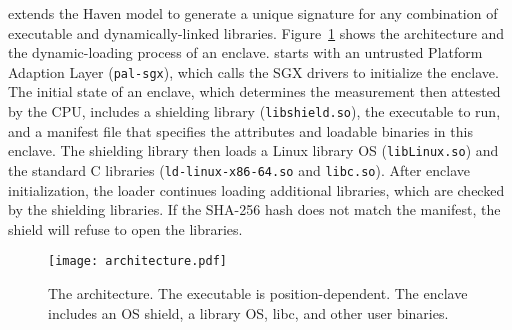 \graphenesgx{} extends the Haven model to generate a unique signature for
any combination of executable and dynamically-linked libraries.
Figure~\ref{fig:arch} shows the architecture and the dynamic-loading process
of an enclave. %
\graphenesgx{} starts with an untrusted Platform Adaption Layer ({\tt pal-sgx}), which calls the SGX drivers to initialize the enclave.
The initial state of an enclave, which determines the measurement then 
attested by the CPU, includes a shielding library ({\tt libshield.so}),
the executable to run,
and a manifest file that specifies the attributes and loadable binaries in this enclave.
The shielding library then loads a Linux library OS ({\tt libLinux.so}) and the standard C libraries ({\tt ld-linux-x86-64.so} and {\tt libc.so}).
After enclave initialization, the loader continues loading
additional libraries, which are checked by the shielding libraries.
If the SHA-256 hash does not match the manifest, the shield will refuse
to open the libraries.



\begin{figure}[t!]
\centering
\texttt{[image: architecture.pdf]}
\caption{The \graphenesgx{} architecture. The executable is position-dependent.
The enclave includes an OS shield, a library OS, libc, and other user binaries.
}
\label{fig:arch}
\end{figure}


